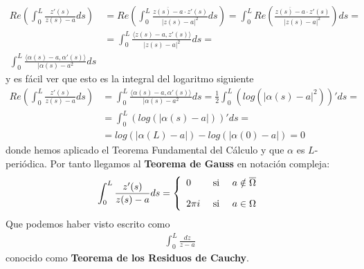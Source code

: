 \begin{observacion}
\begin{enumerate}[start=4]
\begin{align*}
            Re \left( \int_0^L \frac{z'(s)}{z(s)-a} ds\right) &= 
            Re \left( \int_0^L \frac{\overline{z(s)-a} \cdot z'(s)}{|z(s)-a|^2} ds \right) = 
            \int_0^L Re \left(\frac{\overline{z(s)-a} \cdot z'(s)}{|z(s)-a|^2} \right) ds = \\
            &=
            \int_0^L \frac{\langle z(s)-a, z'(s)\rangle}{|z(s)-a|^2} ds =\\ 
            \int_0^L \frac{\langle \alpha(s)-a, \alpha'(s) \rangle}{|\alpha(s) - a^2} ds
        \end{align*}
        y es fácil ver que esto es la integral del logaritmo siguiente
        \begin{align*}
            Re \left( \int_0^L \frac{z'(s)}{z(s)-a} ds\right) &= 
            \int_0^L \frac{\langle \alpha(s)-a, \alpha'(s) \rangle}{|\alpha(s) - a^2} ds =
            \frac{1}{2}\int_0^L \left(log(|\alpha(s)-a|^2)\right)' ds=\\
            &= 
            \int_0^L \left(log(|\alpha(s)-a|)\right)'ds =\\
            &=
            log(|\alpha(L)-a|) - log(|\alpha(0)-a|) = 0
        \end{align*}
        donde hemos aplicado el Teorema Fundamental del Cálculo y que $\alpha$ es $L$-periódica. Por tanto llegamos al \textbf{Teorema de Gauss} en notación compleja:
        \begin{gather*}
           \int_0^L \frac{z'(s)}{z(s)-a} ds= 
            \left\{
                \begin{array}{l c c}
                    0 & \text{ si } & a\notin \overline{\Omega}\\[1em]
                    2\pi i & \text{ si } & a\in \Omega
                \end{array}
            \right.
        \end{gather*}
        Que podemos haber visto escrito como
        \begin{gather*}
            \int_0^L \frac{dz}{z-a}
        \end{gather*}
        conocido como \textbf{Teorema de los Residuos de Cauchy}.


\end{enumerate}
\end{observacion}
